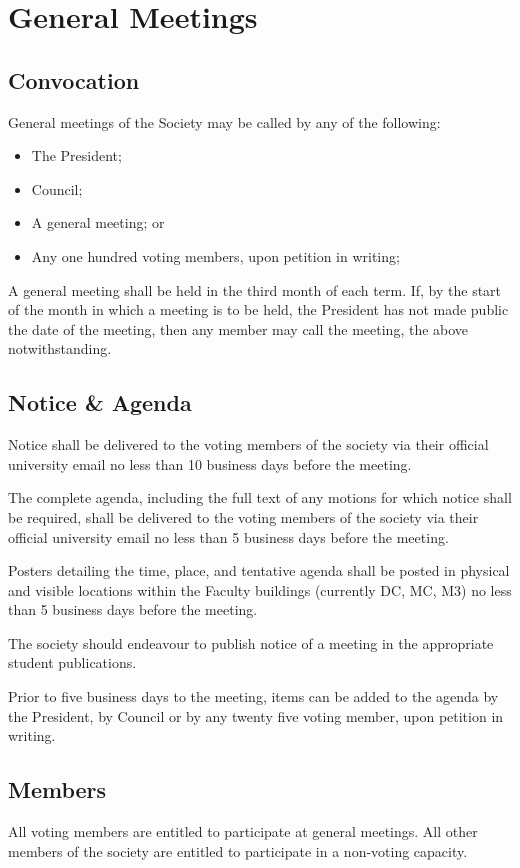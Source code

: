 \section{General Meetings}
\subsection{Convocation}
General meetings of the Society may be called by any of the following:
\begin{itemize}
  \item The President;
  \item Council;
  \item A general meeting; or
  \item Any one hundred voting members, upon petition in writing;
\end{itemize}

A general meeting shall be held in the third month of each term. If, by the
start of the month in which a meeting is to be held, the President has not
made public the date of the meeting, then any member may call the meeting, the
above notwithstanding.

\subsection{Notice \& Agenda}

Notice shall be delivered to the voting members of the society via their official university email no less than 10 business days before the meeting.

The complete agenda, including the full text of any motions for which notice shall be required, shall be delivered to the voting members of the society via their official university email no less than 5 business days before the meeting.

Posters detailing the time, place, and tentative agenda shall be posted in physical and visible locations within the Faculty buildings (currently DC, MC, M3) no less than 5 business days before the meeting.

The society should endeavour to publish notice of a meeting in the appropriate student publications.

Prior to five business days to the meeting, items can be added to the agenda by the President, by Council or by any twenty five voting member, upon petition in writing.

\subsection{Members}
All voting members are entitled to participate at general meetings. All other
members of the society are entitled to participate in a non-voting capacity.

